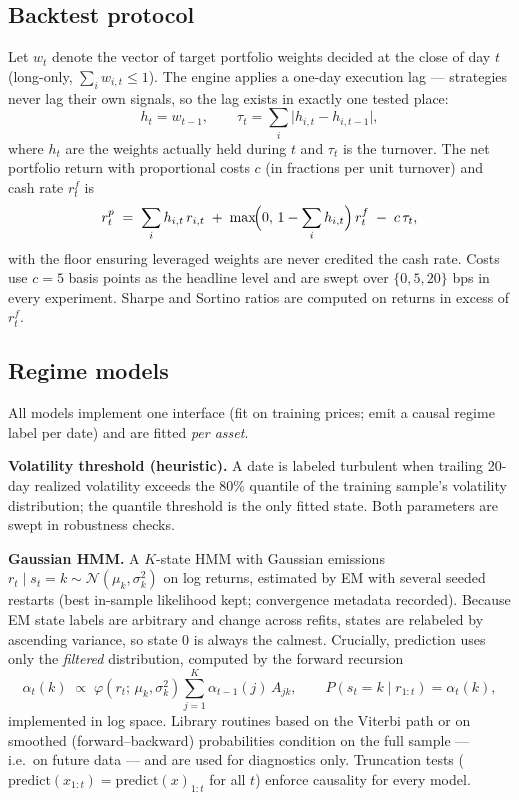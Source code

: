 \documentclass[11pt]{article}
\begin{document}
\subsection{Backtest protocol}

Let $w_t$ denote the vector of target portfolio weights decided at the close
of day $t$ (long-only, $\sum_i w_{i,t} \le 1$). The engine applies a one-day
execution lag --- strategies never lag their own signals, so the lag exists in
exactly one tested place:
\begin{equation}
  h_t = w_{t-1}, \qquad
  \tau_t = \sum_i \lvert h_{i,t} - h_{i,t-1} \rvert ,
\end{equation}
where $h_t$ are the weights actually held during $t$ and $\tau_t$ is the
turnover. The net portfolio return with proportional costs $c$ (in fractions
per unit turnover) and cash rate $r^f_t$ is
\begin{equation}
  r^p_t \;=\; \sum_i h_{i,t}\, r_{i,t}
  \;+\; \max\!\Bigl(0,\, 1 - \sum_i h_{i,t}\Bigr)\, r^f_t
  \;-\; c\,\tau_t ,
\end{equation}
with the floor ensuring leveraged weights are never credited the cash rate.
Costs use $c = 5$ basis points as the headline level and are swept over
$\{0, 5, 20\}$ bps in every experiment. Sharpe and Sortino ratios are computed
on returns in excess of $r^f_t$.

\subsection{Regime models}

All models implement one interface (fit on training prices; emit a causal
regime label per date) and are fitted \emph{per asset}.

\textbf{Volatility threshold (heuristic).} A date is labeled turbulent when
trailing 20-day realized volatility exceeds the 80\% quantile of the training
sample's volatility distribution; the quantile threshold is the only fitted
state. Both parameters are swept in robustness checks.

\textbf{Gaussian HMM.} A $K$-state HMM with Gaussian emissions
$r_t \mid s_t = k \sim \mathcal{N}(\mu_k, \sigma_k^2)$ on log returns,
estimated by EM with several seeded restarts (best in-sample likelihood kept;
convergence metadata recorded). Because EM state labels are arbitrary and
change across refits, states are relabeled by ascending variance, so state $0$
is always the calmest. Crucially, prediction uses only the \emph{filtered}
distribution, computed by the forward recursion
\begin{equation}
  \alpha_t(k) \;\propto\; \varphi\!\left(r_t;\, \mu_k, \sigma_k^2\right)
  \sum_{j=1}^{K} \alpha_{t-1}(j)\, A_{jk},
  \qquad
  P\!\left(s_t = k \mid r_{1:t}\right) = \alpha_t(k),
\end{equation}
implemented in log space. Library routines based on the Viterbi path or on
smoothed (forward--backward) probabilities condition on the full sample ---
i.e.\ on future data --- and are used for diagnostics only. Truncation tests
($\text{predict}(x_{1:t}) = \text{predict}(x)_{1:t}$ for all $t$) enforce
causality for every model.
\end{document}
